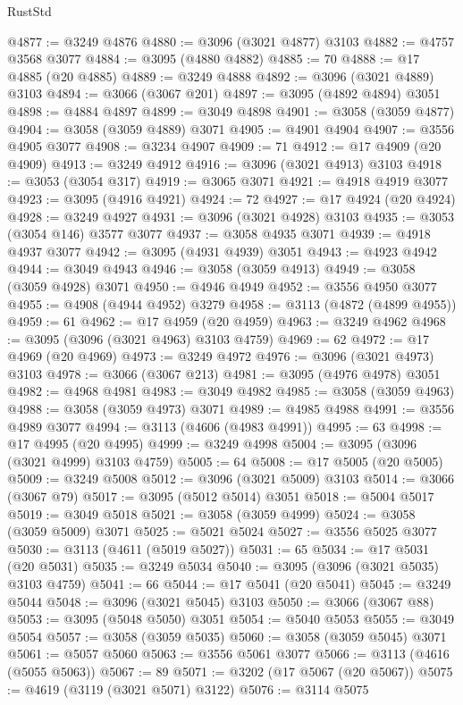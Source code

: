 \begin{lexlean}{RustStd}
\begin{coremodule}
{\begin{coremodule}
{{{{{{{{{{{{{{{{{{{{{{{{{{{{{{{{@4877 := @3249 @4876
@4880 := @3096 (@3021 @4877) @3103
@4882 := @4757 @3568 @3077
@4884 := @3095 (@4880 @4882)
@4885 := 70
@4888 := @17 @4885 (@20 @4885)
@4889 := @3249 @4888
@4892 := @3096 (@3021 @4889) @3103
@4894 := @3066 (@3067 @201)
@4897 := @3095 (@4892 @4894) @3051
@4898 := @4884 @4897
@4899 := @3049 @4898
@4901 := @3058 (@3059 @4877)
@4904 := @3058 (@3059 @4889) @3071
@4905 := @4901 @4904
@4907 := @3556 @4905 @3077
@4908 := @3234 @4907
@4909 := 71
@4912 := @17 @4909 (@20 @4909)
@4913 := @3249 @4912
@4916 := @3096 (@3021 @4913) @3103
@4918 := @3053 (@3054 @317)
@4919 := @3065 @3071
@4921 := @4918 @4919 @3077
@4923 := @3095 (@4916 @4921)
@4924 := 72
@4927 := @17 @4924 (@20 @4924)
@4928 := @3249 @4927
@4931 := @3096 (@3021 @4928) @3103
@4935 := @3053 (@3054 @146) @3577 @3077
@4937 := @3058 @4935 @3071
@4939 := @4918 @4937 @3077
@4942 := @3095 (@4931 @4939) @3051
@4943 := @4923 @4942
@4944 := @3049 @4943
@4946 := @3058 (@3059 @4913)
@4949 := @3058 (@3059 @4928) @3071
@4950 := @4946 @4949
@4952 := @3556 @4950 @3077
@4955 := @4908 (@4944 @4952) @3279
@4958 := @3113 (@4872 (@4899 @4955))
@4959 := 61
@4962 := @17 @4959 (@20 @4959)
@4963 := @3249 @4962
@4968 := @3095 (@3096 (@3021 @4963) @3103 @4759)
@4969 := 62
@4972 := @17 @4969 (@20 @4969)
@4973 := @3249 @4972
@4976 := @3096 (@3021 @4973) @3103
@4978 := @3066 (@3067 @213)
@4981 := @3095 (@4976 @4978) @3051
@4982 := @4968 @4981
@4983 := @3049 @4982
@4985 := @3058 (@3059 @4963)
@4988 := @3058 (@3059 @4973) @3071
@4989 := @4985 @4988
@4991 := @3556 @4989 @3077
@4994 := @3113 (@4606 (@4983 @4991))
@4995 := 63
@4998 := @17 @4995 (@20 @4995)
@4999 := @3249 @4998
@5004 := @3095 (@3096 (@3021 @4999) @3103 @4759)
@5005 := 64
@5008 := @17 @5005 (@20 @5005)
@5009 := @3249 @5008
@5012 := @3096 (@3021 @5009) @3103
@5014 := @3066 (@3067 @79)
@5017 := @3095 (@5012 @5014) @3051
@5018 := @5004 @5017
@5019 := @3049 @5018
@5021 := @3058 (@3059 @4999)
@5024 := @3058 (@3059 @5009) @3071
@5025 := @5021 @5024
@5027 := @3556 @5025 @3077
@5030 := @3113 (@4611 (@5019 @5027))
@5031 := 65
@5034 := @17 @5031 (@20 @5031)
@5035 := @3249 @5034
@5040 := @3095 (@3096 (@3021 @5035) @3103 @4759)
@5041 := 66
@5044 := @17 @5041 (@20 @5041)
@5045 := @3249 @5044
@5048 := @3096 (@3021 @5045) @3103
@5050 := @3066 (@3067 @88)
@5053 := @3095 (@5048 @5050) @3051
@5054 := @5040 @5053
@5055 := @3049 @5054
@5057 := @3058 (@3059 @5035)
@5060 := @3058 (@3059 @5045) @3071
@5061 := @5057 @5060
@5063 := @3556 @5061 @3077
@5066 := @3113 (@4616 (@5055 @5063))
@5067 := 89
@5071 := @3202 (@17 @5067 (@20 @5067))
@5075 := @4619 (@3119 (@3021 @5071) @3122)
@5076 := @3114 @5075
}}}}}}}}}}}}}}}}}}}}}}}}}}}}}}}}
\end{coremodule}}
\end{coremodule}
\end{lexlean}
